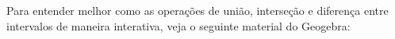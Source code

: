 Para entender melhor como as operações de união, interseção e diferença entre intervalos de maneira interativa, veja o seguinte material do Geogebra:








